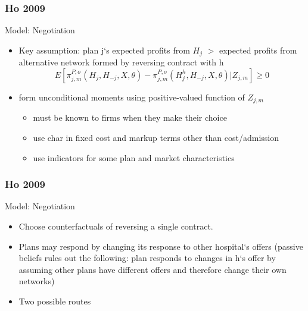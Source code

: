 \documentclass[aspectratio=169,11pt]{beamer}
\begin{document}
\begin{frame}
\frametitle{Ho 2009}

Model: Negotiation
\begin{itemize}
\item Key assumption: plan j`s expected profits from $H_{j}$ $>$ expected profits from alternative network formed by reversing contract with h
\[
E[\pi _{j,m}^{P,o}(H_{j},H_{-j},X,\theta )-\pi
_{j,m}^{P,o}(H_{j}^{h},H_{-j},X,\theta )|Z_{j,m}]\geq 0
\]
\item form unconditional moments using positive-valued function of $Z_{j,m}$
\begin{itemize}
\item must be known to firms when they make their choice
\item use char in fixed cost and markup terms other than cost/admission
\item use indicators for some plan and market characteristics
\end{itemize}

\end{itemize}

\end{frame}

\begin{frame}
\frametitle{Ho 2009}

Model: Negotiation
\begin{itemize}
\item Choose counterfactuals of reversing a single contract.
\item Plans may respond by changing its response to other hospital`s offers (passive beliefs rules out the following: plan responds to changes in h`s offer by assuming other plans have different offers and therefore change their own networks)
\item Two possible routes
\end{itemize}

\end{frame}
\end{document}
